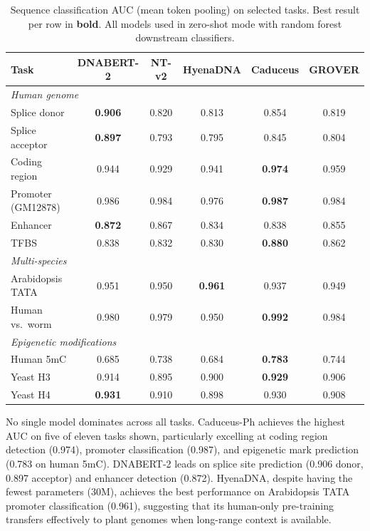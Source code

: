 \documentclass{article}
\begin{document}
\begin{table}[t]
\centering
\caption{Sequence classification AUC (mean token pooling) on selected tasks.
Best result per row in \textbf{bold}. All models used in zero-shot mode with
random forest downstream classifiers.}
\label{tab:classification}
\begin{tabular}{lccccc}
\toprule
Task & DNABERT-2 & NT-v2 & HyenaDNA & Caduceus & GROVER \\
\midrule
\multicolumn{6}{l}{\textit{Human genome}} \\
Splice donor     & \textbf{0.906} & 0.820 & 0.813 & 0.854 & 0.819 \\
Splice acceptor  & \textbf{0.897} & 0.793 & 0.795 & 0.845 & 0.804 \\
Coding region    & 0.944 & 0.929 & 0.941 & \textbf{0.974} & 0.959 \\
Promoter (GM12878) & 0.986 & 0.984 & 0.976 & \textbf{0.987} & 0.984 \\
Enhancer         & \textbf{0.872} & 0.867 & 0.834 & 0.838 & 0.855 \\
TFBS             & 0.838 & 0.832 & 0.830 & \textbf{0.880} & 0.862 \\
\midrule
\multicolumn{6}{l}{\textit{Multi-species}} \\
Arabidopsis TATA & 0.951 & 0.950 & \textbf{0.961} & 0.937 & 0.949 \\
Human vs.\ worm  & 0.980 & 0.979 & 0.950 & \textbf{0.992} & 0.984 \\
\midrule
\multicolumn{6}{l}{\textit{Epigenetic modifications}} \\
Human 5mC        & 0.685 & 0.738 & 0.684 & \textbf{0.783} & 0.744 \\
Yeast H3         & 0.914 & 0.895 & 0.900 & \textbf{0.929} & 0.906 \\
Yeast H4         & \textbf{0.931} & 0.910 & 0.898 & 0.930 & 0.908 \\
\bottomrule
\end{tabular}
\end{table}

No single model dominates across all tasks. Caduceus-Ph achieves the highest AUC
on five of eleven tasks shown, particularly excelling at coding region detection
(0.974), promoter classification (0.987), and epigenetic mark prediction (0.783
on human 5mC). DNABERT-2 leads on splice site prediction (0.906 donor, 0.897
acceptor) and enhancer detection (0.872). HyenaDNA, despite having the fewest
parameters (30M), achieves the best performance on Arabidopsis TATA promoter
classification (0.961), suggesting that its human-only pre-training transfers
effectively to plant genomes when long-range context is available.
\end{document}
